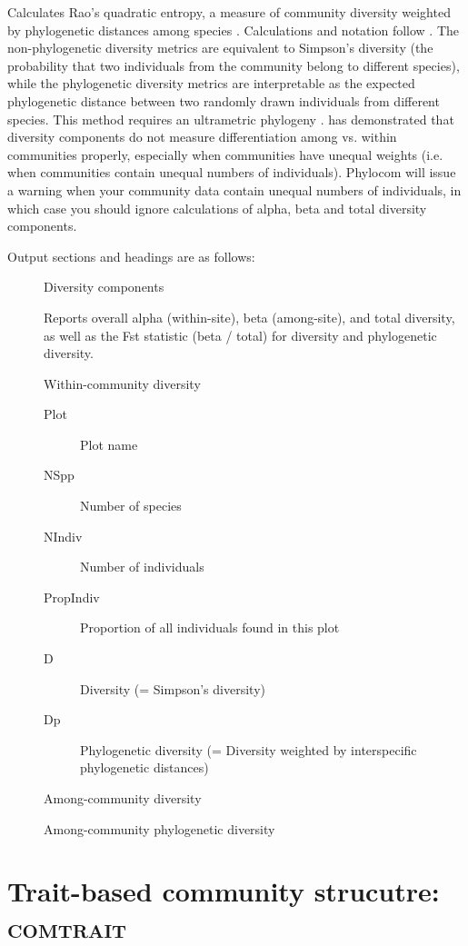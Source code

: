 \documentclass[12pt,letterpaper]{article}
\begin{document}
Calculates Rao's quadratic entropy, a measure of community diversity
weighted by phylogenetic distances among species
\citep{rao1982dad}. Calculations and notation follow
\citet{champely2002mbd}. The non-phylogenetic diversity metrics are
equivalent to Simpson's diversity (the probability that two
individuals from the community belong to different species), while the
phylogenetic diversity metrics are interpretable as the expected
phylogenetic distance between two randomly drawn individuals from different species.
This method requires an ultrametric phylogeny \citep{pavoine2005mdd}. 
\citet{jost2007pdi} has demonstrated that diversity components do not measure differentiation among vs.
within communities properly, especially when
communities have unequal weights (i.e. when communities contain unequal numbers
of individuals). Phylocom will
issue a warning when your community data contain unequal numbers of
individuals, in which case you should ignore calculations of alpha, beta
and total diversity components.

Output sections and headings are as follows:

\begin{description}
  \item[] Diversity components

    Reports overall alpha (within-site), beta (among-site), and total
    diversity, as well as the Fst statistic (beta / total) for
    diversity and phylogenetic diversity.

  \item[] Within-community diversity
    \begin{description}
      \item[Plot] Plot name
      \item[NSpp] Number of species
      \item[NIndiv] Number of individuals
      \item[PropIndiv] Proportion of all individuals found in this plot
      \item[D] Diversity (= Simpson's diversity)
      \item[Dp] Phylogenetic diversity (= Diversity weighted by interspecific phylogenetic distances)
    \end{description}
  \item[] Among-community diversity
  \item[] Among-community phylogenetic diversity
\end{description}

\section{Trait-based community strucutre: {\scshape comtrait}}
\end{document}
